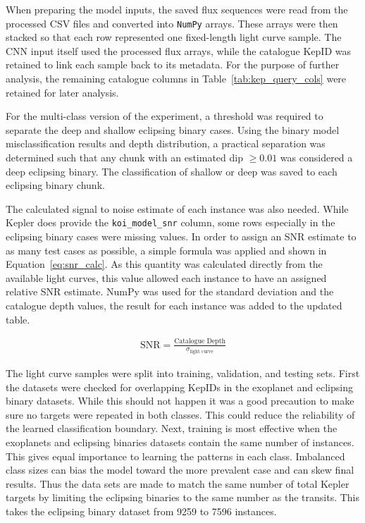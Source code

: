 When preparing the model inputs, the saved flux sequences were read from the processed CSV files and converted into \texttt{NumPy} arrays. These arrays were then stacked so that each row represented one fixed-length light curve sample. The CNN input itself used the processed flux arrays, while the catalogue KepID was retained to link each sample back to its metadata. For the purpose of further analysis, the remaining catalogue columns in Table~\ref{tab:kep_query_cols} were retained for later analysis. 

For the multi-class version of the experiment, a threshold was required to separate the deep and shallow eclipsing binary cases. Using the binary model misclassification results and depth distribution, a practical separation was determined such that any chunk with an estimated dip $\geq 0.01$ was considered a deep eclipsing binary. The classification of shallow or deep was saved to each eclipsing binary chunk.

The calculated signal to noise estimate of each instance was also needed. While Kepler does provide the \texttt{koi\_model\_snr} column, some rows especially in the eclipsing binary cases were missing values. In order to assign an SNR estimate to as many test cases as possible, a simple formula was applied and shown in Equation~\ref{eq:snr_calc}. As this quantity was calculated directly from the available light curves, this value allowed each instance to have an assigned relative SNR estimate. NumPy was used for the standard deviation and the catalogue depth values, the result for each instance was added to the updated table. 

\begin{align}
    \text{SNR} = \frac{\text{Catalogue Depth}}{\sigma_\text{light curve}} \label{eq:snr_calc}
\end{align}

The light curve samples were split into training, validation, and testing sets. First the datasets were checked for overlapping KepIDs in the exoplanet and eclipsing binary datasets. While this should not happen it was a good precaution to make sure no targets were repeated in both classes. This could reduce the reliability of the learned classification boundary. Next, training is most effective when the exoplanets and eclipsing binaries datasets contain the same number of instances. This gives equal importance to learning the patterns in each class. Imbalanced class sizes can bias the model toward the more prevalent case and can skew final results. Thus the data sets are made to match the same number of total Kepler targets by limiting the eclipsing binaries to the same number as the transits. This takes the eclipsing binary dataset from 9259 to 7596 instances. 

